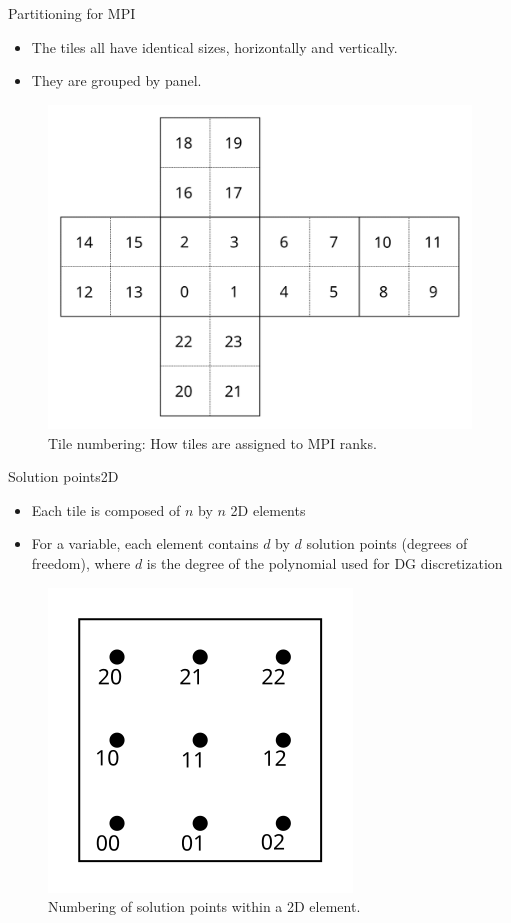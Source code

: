 \documentclass{beamer}
\begin{document}
\begin{frame}{Partitioning for MPI}
\begin{itemize}
    \item The tiles all have identical sizes, horizontally and vertically.
    \item They are grouped by panel.
\end{itemize}
\begin{figure}
    \includegraphics[scale=0.6]{img/multi_tile_numbering}
    \caption{Tile numbering: How tiles are assigned to MPI ranks.}
\end{figure}
\end{frame}

\begin{frame}{Solution points}{2D}
\begin{itemize}
    \item Each tile is composed of $n$ by $n$ 2D elements
    \item For a variable, each element contains $d$ by $d$ solution points (degrees of freedom),
        where $d$ is the degree of the polynomial used for DG discretization
\end{itemize}
\begin{figure}
    \includegraphics[scale=1.0]{img/elem_numbering}
    \caption{Numbering of solution points within a 2D element.}
\end{figure}
\end{frame}
\end{document}
